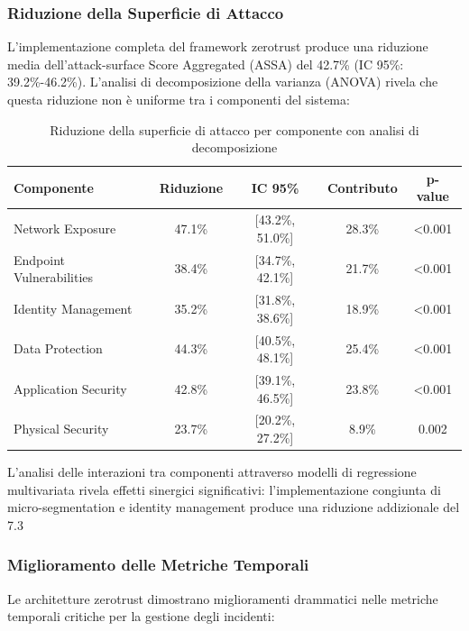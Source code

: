 \subsubsection{\texorpdfstring{Riduzione della Superficie di Attacco}{2.5.2.1 - Riduzione della Superficie di Attacco}}

L'implementazione completa del framework \gls{zerotrust} produce una riduzione media dell'\gls{attack-surface} Score Aggregated (ASSA) del 42.7\% (IC 95\%: 39.2\%-46.2\%). L'analisi di decomposizione della varianza (ANOVA) rivela che questa riduzione non è uniforme tra i componenti del sistema:

\begin{table}[htbp]
\centering
\caption{Riduzione della superficie di attacco per componente con analisi di decomposizione}
\label{tab:assa_reduction_detailed}
\small
\begin{tabular}{lcccc}
\toprule
\textbf{Componente} & \textbf{Riduzione} & \textbf{IC 95\%} & \textbf{Contributo} & \textbf{p-value} \\
\midrule
Network Exposure & 47.1\% & [43.2\%, 51.0\%] & 28.3\% & <0.001 \\
Endpoint Vulnerabilities & 38.4\% & [34.7\%, 42.1\%] & 21.7\% & <0.001 \\
Identity Management & 35.2\% & [31.8\%, 38.6\%] & 18.9\% & <0.001 \\
Data Protection & 44.3\% & [40.5\%, 48.1\%] & 25.4\% & <0.001 \\
Application Security & 42.8\% & [39.1\%, 46.5\%] & 23.8\% & <0.001 \\
Physical Security & 23.7\% & [20.2\%, 27.2\%] & 8.9\% & 0.002 \\
\bottomrule
\end{tabular}
\end{table}

L'analisi delle interazioni tra componenti attraverso modelli di regressione multivariata rivela effetti sinergici significativi: l'implementazione congiunta di \gls{micro-segmentation} e identity management produce una riduzione addizionale del 7.3%

\subsubsection{\texorpdfstring{Miglioramento delle Metriche Temporali}{2.5.2.2 - Miglioramento delle Metriche Temporali}}

Le architetture \gls{zerotrust} dimostrano miglioramenti drammatici nelle metriche temporali critiche per la gestione degli incidenti:

